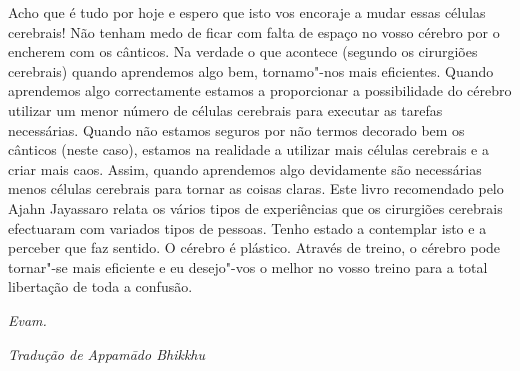Acho que é tudo por hoje e espero que isto vos encoraje a mudar essas
células cerebrais! Não tenham medo de ficar com falta de espaço no vosso
cérebro por o encherem com os cânticos. Na verdade o que acontece
(segundo os cirurgiões cerebrais) quando aprendemos algo bem,
tornamo"-nos mais eficientes. Quando aprendemos algo correctamente
estamos a proporcionar a possibilidade do cérebro utilizar um menor
número de células cerebrais para executar as tarefas necessárias. Quando
não estamos seguros por não termos decorado bem os cânticos (neste
caso), estamos na realidade a utilizar mais células cerebrais e a criar
mais caos. Assim, quando aprendemos algo devidamente são necessárias
menos células cerebrais para tornar as coisas claras. Este livro
recomendado pelo Ajahn Jayassaro relata os vários tipos de experiências
que os cirurgiões cerebrais efectuaram com variados tipos de pessoas.
Tenho estado a contemplar isto e a perceber que faz sentido. O cérebro é
plástico. Através de treino, o cérebro pode tornar"-se mais eficiente e
eu desejo"-vos o melhor no vosso treino para a total libertação de toda a
confusão.

\emph{Evam.}

\vfill
{\raggedleft\itshape\small
  Tradução de Appamādo Bhikkhu
\par}
